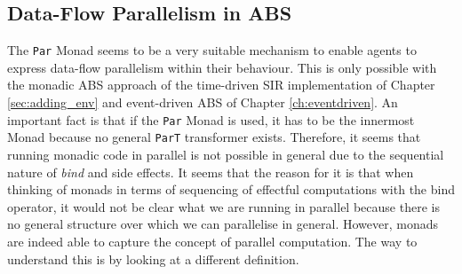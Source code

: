 \subsection{Data-Flow Parallelism in ABS}
The \texttt{Par} Monad seems to be a very suitable mechanism to enable agents to express data-flow parallelism within their behaviour. This is only possible with the monadic ABS approach of the time-driven SIR implementation of Chapter \ref{sec:adding_env} and event-driven ABS of Chapter \ref{ch:eventdriven}. An important fact is that if the \texttt{Par} Monad is used, it has to be the innermost Monad because no general \texttt{ParT} transformer exists. Therefore, it seems that running monadic code in parallel is not possible in general due to the sequential nature of \textit{bind} and side effects. It seems that the reason for it is that when thinking of monads in terms of sequencing of effectful computations with the bind operator, it would not be clear what we are running in parallel because there is no general structure over which we can parallelise in general. However, monads are indeed able to capture the concept of parallel computation. The way to understand this is by looking at a different definition.


